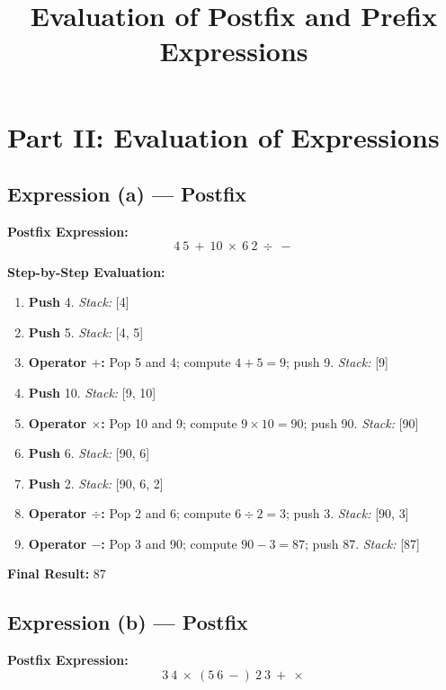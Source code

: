\documentclass[12pt]{article}
\title{Evaluation of Postfix and Prefix Expressions}
\author{}
\date{}
\begin{document}
\maketitle

\section*{Part II: Evaluation of Expressions}

\subsection*{Expression (a) --- Postfix}
\textbf{Postfix Expression:}
\[
4\ 5\ +\ 10\ \times\ 6\ 2\ \div\ -
\]

\textbf{Step-by-Step Evaluation:}
\begin{enumerate}[label=\textbf{Step \arabic*:}, leftmargin=*]
    \item \textbf{Push} 4. \quad \textit{Stack:} [4]
    \item \textbf{Push} 5. \quad \textit{Stack:} [4, 5]
    \item \textbf{Operator \(+\):} Pop 5 and 4; compute \(4+5=9\); push 9. \quad \textit{Stack:} [9]
    \item \textbf{Push} 10. \quad \textit{Stack:} [9, 10]
    \item \textbf{Operator \(\times\):} Pop 10 and 9; compute \(9 \times 10=90\); push 90. \quad \textit{Stack:} [90]
    \item \textbf{Push} 6. \quad \textit{Stack:} [90, 6]
    \item \textbf{Push} 2. \quad \textit{Stack:} [90, 6, 2]
    \item \textbf{Operator \(\div\):} Pop 2 and 6; compute \(6\div 2=3\); push 3. \quad \textit{Stack:} [90, 3]
    \item \textbf{Operator \(-\):} Pop 3 and 90; compute \(90-3=87\); push 87. \quad \textit{Stack:} [87]
\end{enumerate}

\textbf{Final Result:} \(\boxed{87}\)

\newpage
\subsection*{Expression (b) --- Postfix}
\textbf{Postfix Expression:}
\[
3\ 4\ \times\ (5\ 6\ -)\ 2\ 3\ +\ \times
\]
\end{document}
